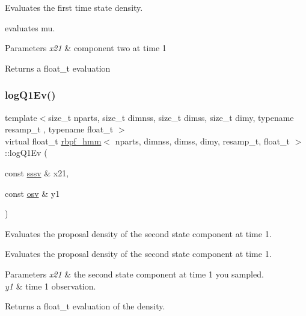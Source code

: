 Evaluates the first time state density. 

evaluates mu. 
\begin{DoxyParams}{Parameters}
{\em x21} & component two at time 1 \\
\hline
\end{DoxyParams}
\begin{DoxyReturn}{Returns}
a float\+\_\+t evaluation 
\end{DoxyReturn}
\mbox{\label{classrbpf__hmm_a7200983bf6acdbffaab91bec3e980a81}} 
\subsubsection{\texorpdfstring{log\+Q1\+Ev()}{logQ1Ev()}}
{\footnotesize\ttfamily template$<$size\+\_\+t nparts, size\+\_\+t dimnss, size\+\_\+t dimss, size\+\_\+t dimy, typename resamp\+\_\+t , typename float\+\_\+t $>$ \\
virtual float\+\_\+t \hyperlink{classrbpf__hmm}{rbpf\+\_\+hmm}$<$ nparts, dimnss, dimss, dimy, resamp\+\_\+t, float\+\_\+t $>$\+::log\+Q1\+Ev (\begin{DoxyParamCaption}\item[{const \hyperlink{classrbpf__hmm_a28e8ad1d93bcf53cb74603f74826a81c}{sssv} \&}]{x21,  }\item[{const \hyperlink{classrbpf__hmm_adafd37687fdd3bb776d3d33a5b0e7080}{osv} \&}]{y1 }\end{DoxyParamCaption})\hspace{0.3cm}{\ttfamily [pure virtual]}}



Evaluates the proposal density of the second state component at time 1. 

Evaluates the proposal density of the second state component at time 1. 
\begin{DoxyParams}{Parameters}
{\em x21} & the second state component at time 1 you sampled. \\
\hline
{\em y1} & time 1 observation. \\
\hline
\end{DoxyParams}
\begin{DoxyReturn}{Returns}
a float\+\_\+t evaluation of the density. 
\end{DoxyReturn}
\mbox{\label{classrbpf__hmm_a79dfd2e1b728f16c6d20269452ff3531}} 
